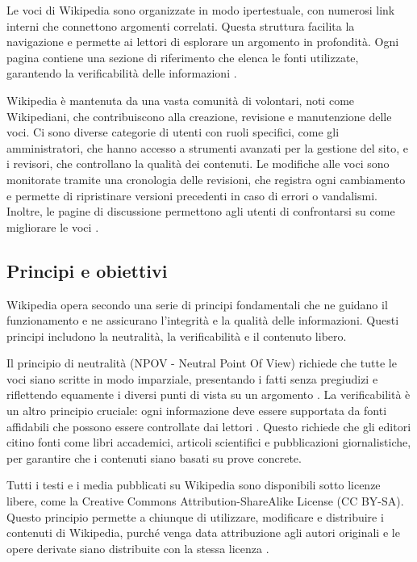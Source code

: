 \documentclass[12pt,a4paper]{report}
\begin{document}
Le voci di Wikipedia sono organizzate in modo ipertestuale, con numerosi link interni che connettono argomenti correlati. Questa struttura facilita la navigazione e permette ai lettori di esplorare un argomento in profondità. Ogni pagina contiene una sezione di riferimento che elenca le fonti utilizzate, garantendo la verificabilità delle informazioni \cite{denning2005wikipedia}.

Wikipedia è mantenuta da una vasta comunità di volontari, noti come Wikipediani, che contribuiscono alla creazione, revisione e manutenzione delle voci. Ci sono diverse categorie di utenti con ruoli specifici, come gli amministratori, che hanno accesso a strumenti avanzati per la gestione del sito, e i revisori, che controllano la qualità dei contenuti. Le modifiche alle voci sono monitorate tramite una cronologia delle revisioni, che registra ogni cambiamento e permette di ripristinare versioni precedenti in caso di errori o vandalismi. Inoltre, le pagine di discussione permettono agli utenti di confrontarsi su come migliorare le voci \cite{reagle2010good}.

\subsection{Principi e obiettivi}

Wikipedia opera secondo una serie di principi fondamentali che ne guidano il funzionamento e ne assicurano l'integrità e la qualità delle informazioni. Questi principi includono la neutralità, la verificabilità e il contenuto libero.

Il principio di neutralità (NPOV - Neutral Point Of View) richiede che tutte le voci siano scritte in modo imparziale, presentando i fatti senza pregiudizi e riflettendo equamente i diversi punti di vista su un argomento \cite{reagle2010good}. La verificabilità è un altro principio cruciale: ogni informazione deve essere supportata da fonti affidabili che possono essere controllate dai lettori \cite{denning2005wikipedia}. Questo richiede che gli editori citino fonti come libri accademici, articoli scientifici e pubblicazioni giornalistiche, per garantire che i contenuti siano basati su prove concrete.

Tutti i testi e i media pubblicati su Wikipedia sono disponibili sotto licenze libere, come la Creative Commons Attribution-ShareAlike License (CC BY-SA). Questo principio permette a chiunque di utilizzare, modificare e distribuire i contenuti di Wikipedia, purché venga data attribuzione agli autori originali e le opere derivate siano distribuite con la stessa licenza \cite{jemielniak2014wikipedia}.
\end{document}
